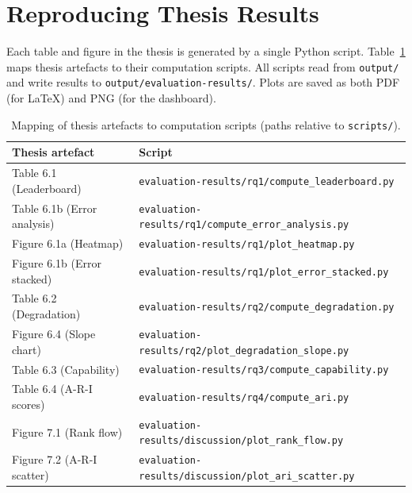 \section{Reproducing Thesis Results}

Each table and figure in the thesis is generated by a single Python script. Table~\ref{tab:result-scripts} maps thesis artefacts to their computation scripts. All scripts read from \texttt{output/} and write results to \texttt{output/evaluation-results/}. Plots are saved as both PDF (for LaTeX) and PNG (for the dashboard).

\begin{table}[H]
\centering
\scriptsize
\caption{Mapping of thesis artefacts to computation scripts (paths relative to \texttt{scripts/}).}
\label{tab:result-scripts}
\begin{tabular}{@{}l l@{}}
\toprule
\textbf{Thesis artefact} & \textbf{Script} \\
\midrule
Table 6.1 (Leaderboard)       & \texttt{evaluation-results/rq1/compute\_leaderboard.py} \\
Table 6.1b (Error analysis)    & \texttt{evaluation-results/rq1/compute\_error\_analysis.py} \\
Figure 6.1a (Heatmap)          & \texttt{evaluation-results/rq1/plot\_heatmap.py} \\
Figure 6.1b (Error stacked)    & \texttt{evaluation-results/rq1/plot\_error\_stacked.py} \\
Table 6.2 (Degradation)        & \texttt{evaluation-results/rq2/compute\_degradation.py} \\
Figure 6.4 (Slope chart)       & \texttt{evaluation-results/rq2/plot\_degradation\_slope.py} \\
Table 6.3 (Capability)         & \texttt{evaluation-results/rq3/compute\_capability.py} \\
Table 6.4 (A-R-I scores)       & \texttt{evaluation-results/rq4/compute\_ari.py} \\
Figure 7.1 (Rank flow)         & \texttt{evaluation-results/discussion/plot\_rank\_flow.py} \\
Figure 7.2 (A-R-I scatter)     & \texttt{evaluation-results/discussion/plot\_ari\_scatter.py} \\
\bottomrule
\end{tabular}
\end{table}

